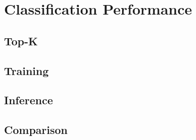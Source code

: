 \section{Classification Performance}
\label{sec:verification_and_benchmark:classification_performance}

\subsection{Top-K}
\label{subsec:verification_and_benchmark:classification_performance:topk}




\subsection{Training}
\label{subsec:verification_and_benchmark:classification_performance:training}

\subsection{Inference}
\label{subsec:verification_and_benchmark:classification_performance:inference}


\subsection{Comparison}
\label{subsec:verification_and_benchmark:classification_performance:comparison}

